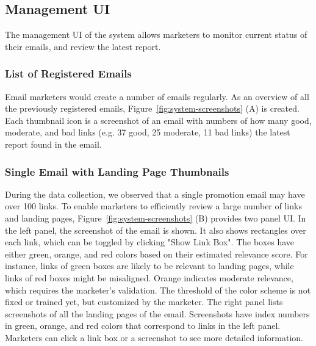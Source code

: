 \documentclass{sigchi}
\begin{document}
\subsection{Management UI}
The management UI of the system allows marketers to monitor current status of their emails, and review the latest report.    



\subsubsection{List of Registered Emails}
Email marketers would create a number of emails regularly. As an overview of all the previously registered emails, Figure~\ref{fig:system-screenshots} (A) is created. Each thumbnail icon is a screenshot of an email with numbers of how many good, moderate, and bad links (e.g. {\color{green}37} good, {\color{orange}25} moderate, {\color{red}11} bad links) the latest report found in the email.  

\subsubsection{Single Email with Landing Page Thumbnails}
During the data collection, we observed that a single promotion email may have over 100 links. To enable marketers to efficiently review a large number of links and landing pages, Figure~\ref{fig:system-screenshots} (B) provides two panel UI. In the left panel, the screenshot of the email is shown. It also shows rectangles over each link, which can be toggled by clicking "Show Link Box". The boxes have either green, orange, and red colors based on their estimated relevance score. For instance, links of green boxes are likely to be relevant to landing pages, while links of red boxes might be misaligned. Orange indicates moderate relevance, which requires the marketer's validation. The threshold of the color scheme is not fixed or trained yet, but customized by the marketer. The right panel lists screenshots of all the landing pages of the email. Screenshots have index numbers in green, orange, and red colors that correspond to links in the left panel. Marketers can click a link box or a screenshot to see more detailed information. 
\end{document}
